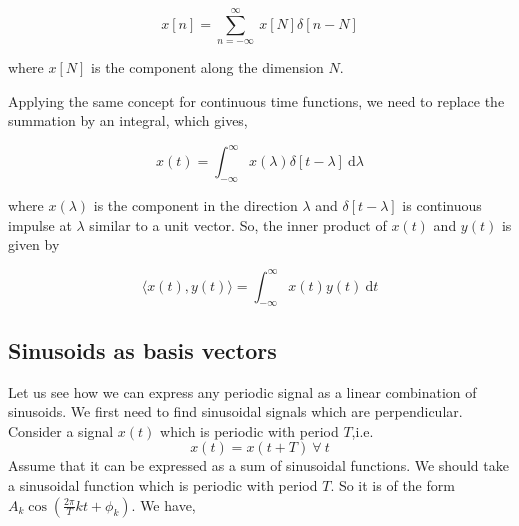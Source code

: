     	\begin{equation*}	x[n] = 	\sum_{n=-\infty}^{\infty}\ x[N]\delta[n-N]\end{equation*}
            
            where $x[N]$ is the component along the dimension $N$.
       
Applying the same concept for continuous time functions, we need to replace the summation by an integral, which gives,

					\begin{equation*}x(t) = \int_{-\infty}^{\infty} \! x(\lambda)\delta[t-\lambda] \ \mathrm{d}\lambda\end{equation*}
                    
             where $x(\lambda)$ is the component in the direction $\lambda$ and $\delta[t-\lambda]$ is continuous impulse at $\lambda$ similar to a unit vector. So, the inner product of $x(t)$ and $y(t)$ is given by
             
           \begin{equation*} \langle x(t),y(t) \rangle = \int_{-\infty}^{\infty} \! x(t)y(t) \ \mathrm{d} t\end{equation*}
             
 \subsection{Sinusoids as basis vectors}
          Let us see how we can express any periodic signal as a linear combination of sinusoids. We first need to find sinusoidal signals which are perpendicular. Consider a signal $x(t)$ which is periodic with period $T$,i.e. 
          \begin{equation*}
            x(t) = x(t+T) \ \forall \ t 
          \end{equation*}
          Assume that it can be expressed as a sum of sinusoidal functions. We should take a sinusoidal function which is periodic with period $T$. So it is of the form $A_k\cos (\frac{2\pi}{T}kt + \phi_k)$. We have,
          
